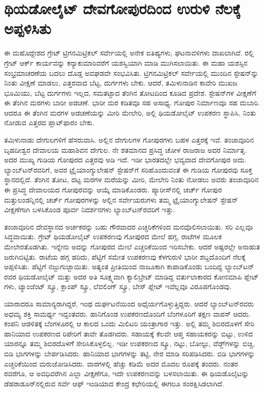 
\chapter{ಥಿಯಡೋಲೈಟ್​ ದೇವಗೋಪುರದಿಂದ ಉರುಳಿ ನೆಲಕ್ಕೆ ಅಪ್ಪಳಿಸಿತು}

ಈ ಮಹೊದ್ದೇಶದ ಗ್ರೇಟ್​ ಟ್ರಿಗನಮಿಟ್ರಿಕಲ್​ ಸರ್ವೇಯಲ್ಲಿ ಅನೇಕ ಐತಿಹ್ಯಗಳು, ಘಟನಾವಳಿಗಳು ದಾಖಲಾಗಿವೆ. ರಲ್ಲಿ ಗ್ರೇಟ್​ ಆರ್ಕ್ ಕಾರ್ಯವನ್ನು ಕನ್ಯಾಕುಮಾರಿವರೆಗೆ ಯಶಸ್ವಿಯಾಗಿ ಮಾಡಿ ಮುಗಿಸಲಾಯಿತು. ಈ ಮಹಾ ಯಶಸ್ಸಿನ ಸಂಭ್ರಮಾಚರಣೆಯ ಬದಲು ದೊಡ್ಡ ಅವಘಡವೇ ಸಂಭವಿಸಿತು. ಟ್ರಿಗನಮಿಟ್ರಿಕಲ್​ ಸರ್ವೇಯಲ್ಲಿ ಮುಂದಿನ ಸ್ಟೇಷನ್​ನ್ನು ನಿಂತು ವೀಕ್ಷಣೆ ಮಾಡಲು, ಎತ್ತರವಾದ ಬೆಟ್ಟ, ದುರ್ಗಗಳು ಬೇಕು. ಆದರೆ, ತಮಿಳುನಾಡಿನ ಕಾವೇರಿ ಮುಖಜ ಭೂಮಿಯು, ಬೆಟ್ಟ ದುರ್ಗಗಳು ಇಲ್ಲದ, ಸಮತಟ್ಟಾದ ತೆಂಗಿನ ತೋಟದಿಂದ ಕೂಡಿದ ಪ್ರದೇಶ. ಸ್ಟೇಷನ್​ಗಳ ವೀಕ್ಷಣೆಗೆ ಈ ತೆಂಗಿನ ಮರಗಳು ಬಾರೀ ಅಡಚಣೆ. ಭಾರೀ ಮರ ಕಡಿತವೂ ಸಹ ಅಸಾಧ್ಯ. ಗೋಪುರ ನಿರ್ಮಾಣವೂ ಸಹ ದುಬಾರಿ. ಆದರೂ ಈ ತೆಂಗಿನ ಮರಗಳ ಅಡಚಣೆಯನ್ನು ಮೀರಿ ಮೇಲೇರಿ, ಅಲ್ಲಿ ಥಿಯಡೋಲೈಟ್​ ಉಪಕರಣ ಸ್ಥಾಪಿಸಿ, ನಿಂತು ನೋಡುವ ಎತ್ತರದ ಪ್ಲಾಟ್​ಫಾರಂ ಬೇಕು.

ತಮಿಳುನಾಡು ದೇಗುಲಗಳಿಗೆ ಹೆಸರುವಾಸಿ. ಅಲ್ಲಿನ ದೇಗುಲಗಳ ಗೋಪುರಗಳು ಬಹಳ ಎತ್ತರಕ್ಕೆ ಇವೆ. ತಂಜಾವೂರಿನ ಬೃಹದೀಶ್ವರ ದೇವಾಲಯ ಮಹಾಶಿವನ ದೇಗುಲ. ನೇ ಶತಮಾನದ ಪ್ರಸಿದ್ಧ ಚೋಳ ರಾಜರಾಜ ಅದರ ನಿರ್ಮಾತೃ. ಅದರ ಮುಖ್ಯ ಗುಡಿಯ ಗೋಪುರದ ಎತ್ತರವು  ಅಡಿ ಇದೆ. ಇಡೀ ಭಾರತದಲ್ಲೇ ಭವ್ಯವಾದ ದೇವಗೋಪುರ ಅದು. ಲ್ಯಾಂಬ್​ಟನ್​ರವರಿಗೆ, ಅವರ ಟ್ರೈಯಾಂಗ್ಯುಲೇಷನ್​ ಸ್ಟೇಷನ್​ಗೆ ಸರಿಹೊಂದುವಂತೆ ಈ ಗುಡಿಯ ಗೋಪುರವು ಸೂಕ್ತ ಸ್ಥಾನದಲ್ಲಿದೆ. ತೆಂಗಿನ ತೋಟ, ದಟ್ಟ ಮರಗಳ ಮರೆಯನ್ನು ಮೀರಿ, ಮೇಲೇರಿ ನಿಂತು ನೋಡಲು ಅವರು ತಂಜಾವೂರಿನ ಈ ಪ್ರಸಿದ್ಧ ದೇವಾಲಯದ ಗೋಪುರವನ್ನು ಆಯ್ಕೆ ಮಾಡಿಕೊಂಡರು. ಪ್ಯಾರೀಸ್​ನಲ್ಲಿ ಚರ್ಚ್ ಗೋಪುರ ಮತ್ತು\break ಲಂಡನ್ನಿನಲ್ಲಿ ಚರ್ಚ್ ಗೋಪುರಗಳನ್ನು ಅಲ್ಲಿನ ಸರ್ವೇಯರುಗಳು ತಮ್ಮ ಟ್ರೈಯಾಂಗ್ಯುಲೇಷನ್​ ಸ್ಟೇಷನ್​ ವೀಕ್ಷಣೆಗಾಗಿ ಬಳಸಿಕೊಂಡ ಪೂರ್ವ ನಿದರ್ಶನಗಳು ಲ್ಯಾಂಬ್​ಟನ್​ರವರಿಗೆ ಇತ್ತು.

ತಂಜಾವೂರಿನ ದೇವಸ್ಥಾನದ ಅರ್ಚಕರನ್ನು ಬಹು ಗೌರವಾದರ ಎಚ್ಚರಿಕೆಗಳಿಂದ ಮನವೊಲಿಸಲಾಯಿತು. ಸರಿ ಎಲ್ಲವೂ ಸಿದ್ಧವಾಯಿತು. ಗ್ರೇಟ್​ ಥಿಯಡೋಲೈಟ್​ ಉಪಕರಣವು ಗೋಪುರದ ಮೇಲೆ ಹಗ್ಗ, ರಾಟೆಗಳ ಮೂಲಕ ಮೇಲೇರತೊಡಗಿತು. ಇನ್ನೇನು ಅದನ್ನು ಗೋಪುರದ ಮೇಲೆ ಎಚ್ಚರಿಕೆಯಿಂದ ಇರಿಸಬೇಕು. ಆದರೆ ಅಷ್ಟರಲ್ಲೇ ಅನಾಹುತ ಜರುಗಿಬಿಟ್ಟಿತು. ರಾಟೆಯ ಹಗ್ಗ ಹರಿದು, ಪೆಟ್ಟಿಗೆ ಸಮೇತ ಉಪಕರಣವು ಕೆಳಗುರುಳಿ ಭಾರೀ ಶಬ್ದದೊಂದಿಗೆ ನೆಲಕ್ಕೆ ಅಪ್ಪಳಿಸಿತು. ಪೆಟ್ಟಿಗೆ ನಜ್ಜುಗುಜ್ಜಾಯಿತು. ಅತ್ಯಂತ ಪ್ರೀತಿಯಿಂದ ನಾಜೂಕಾಗಿ ಕಾಪಾಡಿಕೊಂಡು ಬಂದಿದ್ದ ಲ್ಯಾಂಬ್​ಟನ್​ರವರ ಥಿಯಡೋಲೈಟ್​ ಮತ್ತು ಅದರ ಅತಿ ಸೂಕ್ಷ್ಮವಾಗಿ ಕ್ಯಾಲಿಬ್ರೇಟ್​ ಮಾಡಿದ್ದ ವರ್ತುಲಾಕಾರದ ಕೋನಮಾಪಿ ಪ್ಲೇಟ್​ಗಳು, ಟ್ಯಾಂಜೆಂಟ್​ ಸ್ಕ್ರೂ, ಕ್ಲಾಂಪ್​ ಸ್ಕ್ರೂ, ಲೆವಲಿಂಗ್​ ಸ್ಕ್ರೂ, ಬೇಸ್​ ಪ್ಲೇಟ್​ ಇವೆಲ್ಲವೂ ವಿರೂಪಗೊಂಡವು.

ಯಾರಾದರೂ ಸಾಮಾನ್ಯರಾಗಿದ್ದರೆ, ಇಂಥ ದುರ್ಘಟನೆಯಿಂದ ಅಧೈರ್ಯಗೊಳ್ಳುತ್ತಿದ್ದರು. ಆದರೆ ಲ್ಯಾಂಬ್​ಟನ್​ರವರು ಅಧಮ್ಯ ಶಕ್ತಿ ಸಾಮರ್ಥ್ಯ ಇದ್ದಂತವರು. ಹಾನಿಗೊಂಡ ಉಪಕರಣದೊಂದಿಗೆ ಬೆಂಗಳೂರಿಗೆ ತಕ್ಷಣ ವಾಪಸ್​ ಆದರು. ಕಂಪನಿ ಆಡಳಿತಕ್ಕೆ ಬೆಂಗಳೂರಲ್ಲಿ ಆ ಕಾಲದ ಒಂದು ಮಿಲಿಟರಿ ಯಂತ್ರಾಗಾರ ಇತ್ತು. ಅಲ್ಲಿ ತಮ್ಮ ಶಿಬಿರದೊಳಗೆ ಸೇರಿ ಹಾನಿಯಾದ ಉಪಕರಣದ ರಿಪೇರಿಗೆ ತಾವೇ ತೊಡಗಿದರು. ಸಹಾಯಕ್ಕೆ ಕೆಲವೇ ಆಪ್ತ ಸಹಾಯಕರನ್ನು ಬಿಟ್ಟು, ಉಳಿದ ಯಾರನ್ನೂ ತಮ್ಮ ಶಿಬಿರದೊಳಗೆೆ ಸೇರಿಸಿಕೊಳ್ಳಲಿಲ್ಲ. ಇಡೀ ಉಪಕರಣದ ಸ್ಕ್ರೂ, ನಟ್ಟು, ಬೋಲ್ಟು, ವೆಡ್ಜ್​ಗಳನ್ನು ಬಿಚ್ಚಿ, ಬಿಡಿ ಭಾಗಗಳನ್ನು ಬೇರ್ಪಡಿಸಿದರು. ಹಾನಿಯಾದ ಭಾಗಗಳನ್ನು ತಟ್ಟಿ, ನೇರ ಮಾಡಿ ಸರಿಪಡಿಸಿದರು. ಬಿಡಿ ಭಾಗಗಳನ್ನು ಎಚ್ಚರಿಕೆಯಿಂದ ಮರುಜೋಡಿಸಿದರು.  ವಾರಗಳಲ್ಲಿ ಹೆಚ್ಚು ಕಡಿಮೆ ಅದರ ಮೊದಲ ರೂಪಕ್ಕೆ ತಂದರು. ನಂತರ  ರವರೆಗೂ, ಆ ಅವಧಿವರೆಗಿನ ಎಲ್ಲಾ ವೀಕ್ಷಣೆಗೂ, ಇದೇ ಉಪಕರಣವನ್ನು ಬಳಸಲಾಯಿತು. ಈ ಥಿಯಡೊಲೈಟನ್ನು ಡೆಹರಾಡೂನ್​ನಲ್ಲಿರುವ ಸರ್ವೆ ಆಫ್​ ಇಂಡಿಯಾದ ಕೇಂದ್ರ ಕಛೇರಿಯಲ್ಲಿ ಈಗಲೂ ಸಂರಕ್ಷಿಸಿಡಲಾಗಿದೆ.

